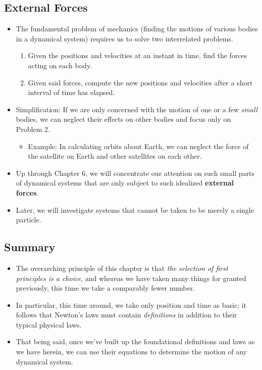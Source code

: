 \documentclass[../notes.tex]{subfiles}
\begin{document}
\subsection*{External Forces}
\begin{itemize}
    \item The fundamental problem of mechanics (finding the motions of various bodies in a dynamical system) requires us to solve two interrelated problems.
    \begin{enumerate}
        \item Given the positions and velocities at an instant in time, find the forces acting on each body.
        \item Given said forces, compute the new positions and velocities after a short interval of time has elapsed.
    \end{enumerate}
    \item Simplification: If we are only concerned with the motion of one or a few \emph{small} bodies, we can neglect their effects on other bodies and focus only on Problem 2.
    \begin{itemize}
        \item Example: In calculating orbits about Earth, we can neglect the force of the satellite on Earth and other satellites on each other.
    \end{itemize}
    \item Up through Chapter 6, we will concentrate our attention on such small parts of dynamical systems that are only subject to such idealized \textbf{external forces}.
    \item Later, we will investigate systems that cannot be taken to be merely a single particle.
\end{itemize}


\subsection*{Summary}
\begin{itemize}
    \item The overarching principle of this chapter is that \emph{the selection of first principles is a choice}, and whereas we have taken many things for granted previously, this time we take a comparably fewer number.
    \item In particular, this time around, we take only position and time as basic; it follows that Newton's laws must contain \emph{definitions} in addition to their typical physical laws.
    \item That being said, once we've built up the foundational definitions and laws as we have herein, we can use their equations to determine the motion of any dynamical system.
\end{itemize}
\end{document}
